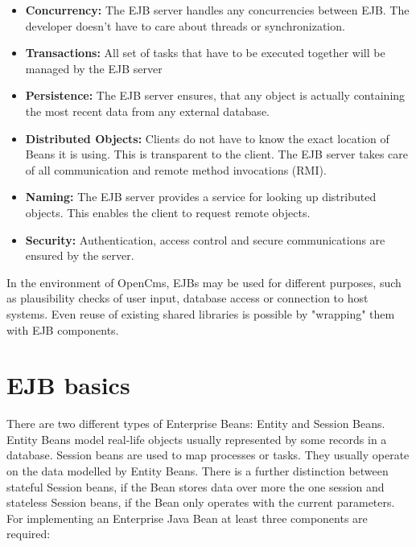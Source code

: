 \begin {itemize}
\item {\bf Concurrency:}
The EJB server handles any concurrencies between EJB. The developer
doesn't have to care about threads or synchronization.
\item {\bf Transactions:}
All set of tasks that have to be executed together will be managed by
the EJB server
\item {\bf Persistence:}
The EJB server ensures, that any object is actually containing the most
recent data from any external database.
\item {\bf Distributed Objects:}
Clients do not have to know the exact location of Beans it is using.
This is transparent to the client. The EJB server takes care of  all
communication and remote method invocations (RMI).
\item {\bf Naming:}
The EJB server provides a service for looking up distributed objects.
This enables the client to request remote objects.
\item {\bf Security:}
Authentication, access control and secure communications are ensured by
the server.
\end{itemize}

In the environment of OpenCms, EJBs may be used for different purposes,
such as plausibility checks of user input, database access or connection
to host systems. Even reuse of existing shared libraries is possible by
{\name "wrapping"} them with EJB components.

\section {EJB basics}
There are two different types of Enterprise Beans: Entity and Session
Beans. Entity Beans model real-life objects usually represented by some
records in a database. Session beans are used to map processes or tasks.
They usually operate on the data modelled by Entity Beans.
There is a further distinction between stateful Session beans, if the
Bean stores data over more the one session and stateless Session beans,
if the Bean only operates with the current parameters.
For implementing an Enterprise Java Bean at least three components
are required:

